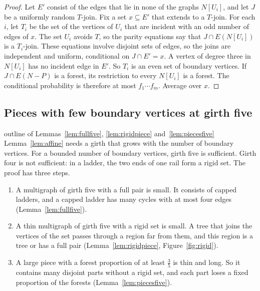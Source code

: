 \begin{proof}
Let $E'$ consist of the edges that lie in none of the graphs $N[U_i]$, and let $J$ be a uniformly
random $T$-join. Fix a set $x\subseteq E'$ that extends to a $T$-join. For each $i$, let $T_i$ be
the set of the vertices of $U_i$ that are incident with an odd number of edges of $x$. The set
$U_i$ avoids $T$, so the parity equations say that $J\cap E(N[U_i])$ is a $T_i$-join. These
equations involve disjoint sets of edges, so the joins are independent and uniform, conditional on
$J\cap E'=x$. A vertex of degree three in $N[U_i]$ has no incident edge in $E'$. So $T_i$ is an
even set of boundary vertices. If $J\cap E(N-P)$ is a forest, its restriction to every $N[U_i]$
is a forest. The conditional probability is therefore at most $f_1\cdots f_m$. Average over $x$.
\end{proof}

\subsection{Pieces with few boundary vertices at girth five}\label{sec:girthfive}

\begin{idea}{outline of Lemmas~\ref{lem:fullfive}, \ref{lem:rigidpiece} and~\ref{lem:piecesfive}}
Lemma~\ref{lem:affine} needs a girth that grows with the number of boundary vertices. For a
bounded number of boundary vertices, girth five is sufficient. Girth four is not sufficient: in
a ladder, the two ends of one rail form a rigid set. The proof has three steps.
\begin{enumerate}[leftmargin=1.5em]
\item A multigraph of girth five with a full pair is small. It consists of capped ladders, and
a capped ladder has many cycles with at most four edges (Lemma~\ref{lem:fullfive}).
\item A thin multigraph of girth five with a rigid set is small. A tree that joins the vertices
of the set passes through a region far from them, and this region is a tree or has a full pair
(Lemma~\ref{lem:rigidpiece}, Figure~\ref{fig:rigid}).
\item A large piece with a forest proportion of at least $\frac35$ is thin and long. So it
contains many disjoint parts without a rigid set, and each part loses a fixed proportion of the
forests (Lemma~\ref{lem:piecesfive}).
\end{enumerate}
\end{idea}


